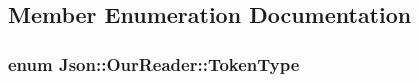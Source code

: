 \subsection{Member Enumeration Documentation}
\subsubsection[{\texorpdfstring{Token\+Type}{TokenType}}]{\setlength{\rightskip}{0pt plus 5cm}enum {\bf Json\+::\+Our\+Reader\+::\+Token\+Type}\hspace{0.3cm}{\ttfamily [private]}}\hypertarget{classJson_1_1OurReader_a15116f7276ddf1e7a2cc3cbefa884dcc}{}\label{classJson_1_1OurReader_a15116f7276ddf1e7a2cc3cbefa884dcc}
